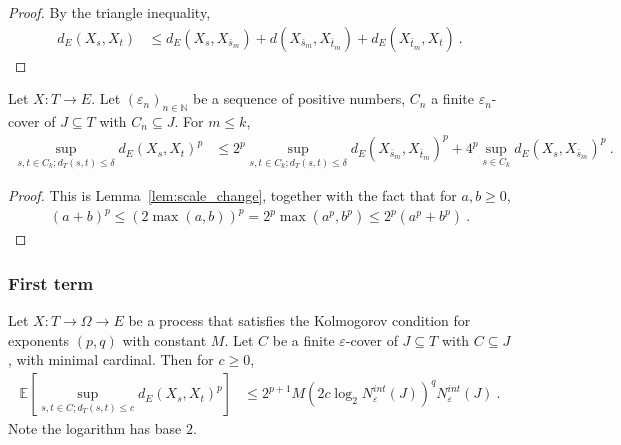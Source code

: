 \begin{proof}\leanok
By the triangle inequality,
\begin{align*}
  d_E(X_s, X_t)
  &\le d_E(X_s, X_{\bar{s}_m}) + d(X_{\bar{s}_m}, X_{\bar{t}_m}) + d_E(X_{\bar{t}_m}, X_t)
  \: .
\end{align*}
\end{proof}


\begin{corollary}\label{cor:scale_change_rpow}
  \leanok
Let $X : T \to E$.
Let $(\varepsilon_n)_{n \in \mathbb{N}}$ be a sequence of positive numbers, $C_n$ a finite $\varepsilon_n$-cover of $J \subseteq T$ with $C_n \subseteq J$.
For $m \le k$,
\begin{align*}
  \sup_{s, t \in C_k; d_T(s, t) \le \delta} d_E(X_s, X_t)^p
  &\le 2^p \sup_{s, t \in C_k; d_T(s, t) \le \delta} d_E(X_{\bar{s}_m}, X_{\bar{t}_m})^p
    + 4^p \sup_{s \in C_k} d_E(X_s, X_{\bar{s}_m})^p
  \: .
\end{align*}
\end{corollary}

\begin{proof}\leanok
This is Lemma~\ref{lem:scale_change}, together with the fact that for $a, b \ge 0$,
\begin{align*}
  (a + b)^p \le (2\max(a,b))^p = 2^p \max(a^p,b^p) \le 2^p (a^p + b^p)
  \: .
\end{align*}
\end{proof}



\subsubsection{First term}


\begin{lemma}\label{lem:integral_sup_rpow_dist_cover_of_dist_le}
  \leanok
Let $X : T \to \Omega \to E$ be a process that satisfies the Kolmogorov condition for exponents $(p,q)$ with constant $M$.
Let $C$ be a finite $\varepsilon$-cover of $J \subseteq T$ with $C \subseteq J$, with minimal cardinal.
Then for $c \ge 0$,
\begin{align*}
  \mathbb{E} \left[ \sup_{s, t \in C; d_T(s, t) \le c} d_E(X_s, X_t)^p \right]
  &\le 2^{p+1} M \left(2 c \log_2 N^{int}_{\varepsilon}(J) \right)^q  N^{int}_{\varepsilon}(J)
  \: .
\end{align*}
Note the logarithm has base $2$.
\end{lemma}

